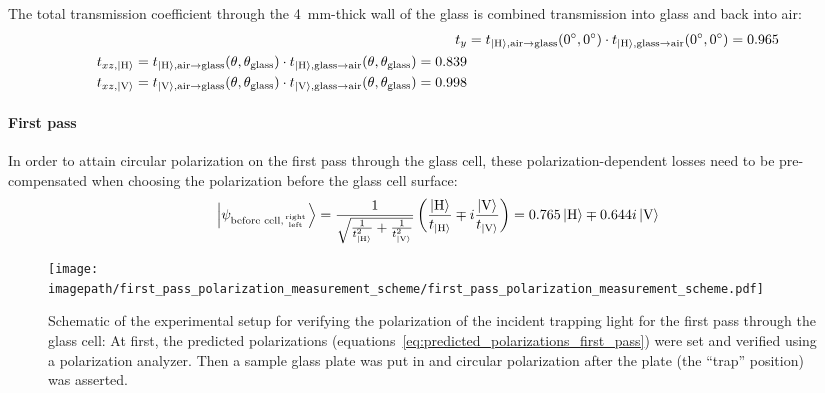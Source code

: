 The total transmission coefficient through the \SI{4}{\milli\meter}-thick wall of the glass is combined transmission into glass and back into air:
\begin{align}
    t_{y} &= t_{\Ket{\text{H}}, \text{air} \rightarrow \text{glass}}(\SI{0}{\degree}, \SI{0}{\degree})  \cdot t_{\Ket{\text{H}}, \text{glass} \rightarrow \text{air}}(\SI{0}{\degree}, \SI{0}{\degree}) = \SI{0.965}{} \\
    \begin{split}
        t_{xz, \Ket{\text{H}}} &= t_{\Ket{\text{H}}, \text{air} \rightarrow \text{glass}}(\theta, \theta_\text{glass})  \cdot t_{\Ket{\text{H}}, \text{glass} \rightarrow \text{air}}(\theta, \theta_\text{glass}) = \SI{0.839}{} \\
        t_{xz, \Ket{\text{V}}} &= t_{\Ket{\text{V}}, \text{air} \rightarrow \text{glass}}(\theta, \theta_\text{glass})  \cdot t_{\Ket{\text{V}}, \text{glass} \rightarrow \text{air}}(\theta, \theta_\text{glass}) = \SI{0.998}{}
    \end{split}
\end{align}

\paragraph{First pass}
In order to attain circular polarization on the first pass through the glass cell, these polarization-dependent losses need to be pre-compensated when choosing the polarization before the glass cell surface:
\begin{align}
    \label{eq:predicted_polarizations_first_pass}
    \Ket{\psi_{\text{before cell,} {\text{right} \atop \text{left}}}} 
    = \frac{1}{\sqrt{\frac{1}{t_{\Ket{\text{H}}}^2} + \frac{1}{t_{\Ket{\text{V}}}^2}}}
        \left(\frac{\Ket{\text{H}}}{t_{\Ket{\text{H}}}} \mp i \frac{\Ket{\text{V}}}{t_{\Ket{\text{V}}}} \right)
    = 0.765 \Ket{\text{H}} \mp 0.644i \Ket{\text{V}}
\end{align}

\begin{figure}
    \centering
    \texttt{[image: \\imagepath/first\_pass\_polarization\_measurement\_scheme/first\_pass\_polarization\_measurement\_scheme.pdf]}
    \caption{Schematic of the experimental setup for verifying the polarization of the incident trapping light for the first pass through the glass cell: At first, the predicted polarizations (equations~\eqref{eq:predicted_polarizations_first_pass}) were set and verified using a polarization analyzer. Then a sample glass plate was put in and circular polarization after the plate (the ``trap'' position) was asserted.}
    \label{fig:first_pass_polarization_measurement_scheme}
\end{figure}

